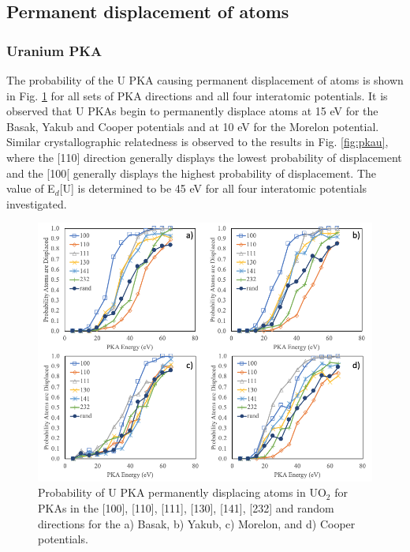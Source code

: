 \documentclass[review]{elsarticle}
\begin{document}
\FloatBarrier

\subsection{Permanent displacement of atoms}\label{sect2}

\subsubsection{Uranium PKA}

The probability of the U PKA causing permanent displacement of atoms is shown in Fig. \ref{fig:dispU} for all sets of PKA directions and all four interatomic potentials. It is observed that U PKAs begin to permanently displace atoms at 15 eV for the Basak, Yakub and Cooper potentials and at 10 eV for the Morelon potential. Similar crystallographic relatedness is observed to the results in Fig. \ref{fig:pkau}, where the [110] direction generally displays the lowest probability of displacement and the [100[ generally displays the highest probability of displacement. The value of E$_d$[U] is determined to be 45 eV for all four interatomic potentials investigated.

\begin{figure}[h]
 \centering
 \includegraphics[width=1.0\textwidth]{dispU.png}
 \caption{Probability of U PKA permanently displacing atoms in UO$_2$ for PKAs in the [100], [110], [111], [130], [141], [232] and random directions for the a) Basak, b) Yakub, c) Morelon, and d) Cooper potentials.}
 \label{fig:dispU}
\end{figure}
\end{document}
